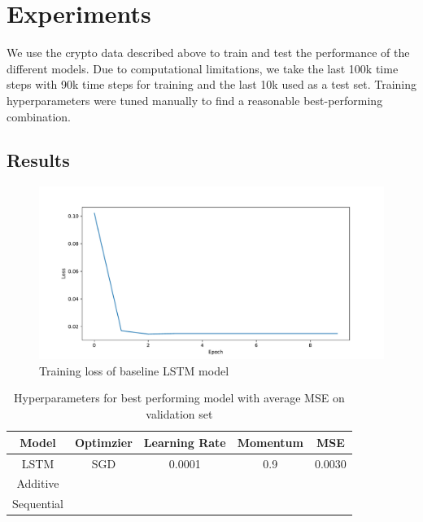 \section{Experiments}

We use the crypto data described above to train and test the performance of the different models. Due to computational limitations, we take the last 100k time steps with 90k time steps for training and the last 10k used as a test set. Training hyperparameters were tuned manually to find a reasonable best-performing combination.

\subsection{Results}

\begin{figure}[H]
	\centering
	\includegraphics[width=\linewidth]{../../figures/vanilla_lstm_training_loss.pdf}
	\caption{Training loss of baseline LSTM model}
	\label{fig:lstm_loss}
\end{figure}

\begin{table}[H]
	\centering
	\begin{tabular}{|c|c|c|c|c|}
	\hline
	Model & Optimzier & Learning Rate & Momentum & MSE \\
	\hline
	LSTM & SGD & 0.0001 & 0.9 & 0.0030 \\
	Additive & & & & \\
	Sequential & & & & \\
	\hline
	\end{tabular}
	\caption{Hyperparameters for best performing model with average MSE on validation set}
	\label{tab:results_summary}
\end{table}